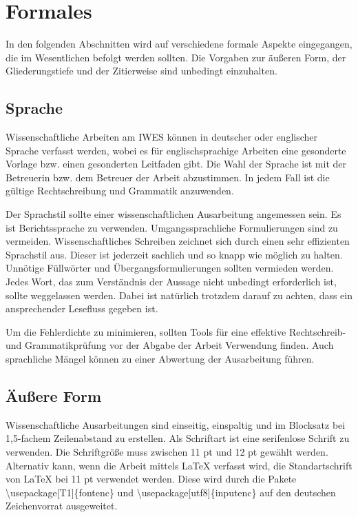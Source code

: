 \chapter{Formales}
\label{cha:form_DE}

In den folgenden Abschnitten wird auf verschiedene formale Aspekte eingegangen, die im Wesentlichen befolgt werden sollten. Die Vorgaben zur äußeren Form, der Gliederungstiefe und der Zitierweise sind unbedingt einzuhalten.

\section{Sprache}
\label{sec:sprache}

Wissenschaftliche Arbeiten am IWES können in deutscher oder englischer Sprache verfasst werden, wobei es für englischsprachige Arbeiten eine gesonderte Vorlage bzw. einen gesonderten Leitfaden gibt. Die Wahl der Sprache ist mit der Betreuerin bzw. dem Betreuer der Arbeit abzustimmen. In jedem Fall ist die gültige Rechtschreibung und Grammatik anzuwenden.

Der Sprachstil sollte einer wissenschaftlichen Ausarbeitung angemessen sein. Es ist Berichtssprache zu verwenden. Umgangssprachliche Formulierungen sind zu vermeiden. Wissenschaftliches Schreiben zeichnet sich durch einen sehr effizienten Sprachstil aus. Dieser ist jederzeit sachlich und so knapp wie möglich zu halten. Unnötige Füllwörter und Übergangsformulierungen sollten vermieden werden. Jedes Wort, das zum Verständnis der Aussage nicht unbedingt erforderlich ist, sollte weggelassen werden. Dabei ist natürlich trotzdem darauf zu achten, dass ein ansprechender Lesefluss gegeben ist.

Um die Fehlerdichte zu minimieren, sollten Tools für eine effektive Rechtschreib- und Grammatikprüfung vor der Abgabe der Arbeit Verwendung finden. Auch sprachliche Mängel können zu einer Abwertung der Ausarbeitung führen.

\section{Äußere Form}
\label{sec:form_DE}

Wissenschaftliche Ausarbeitungen sind einseitig, einspaltig und im Blocksatz bei 1,5-fachem Zeilenabstand zu erstellen. Als Schriftart ist eine serifenlose Schrift zu verwenden. Die Schriftgröße muss zwischen 11 pt und 12 pt gewählt werden. Alternativ kann, wenn die Arbeit mittels \LaTeX{} verfasst wird, die Standartschrift von \LaTeX{} bei 11 pt verwendet werden. Diese wird durch die Pakete \textbackslash{}usepackage[T1]\{fontenc\} und \textbackslash{}usepackage[utf8]\{inputenc\} auf den deutschen Zeichenvorrat ausgeweitet.

